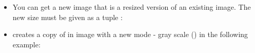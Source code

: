\documentclass[letterpaper,10pt,english]{sphinxmanual}
\begin{document}
\begin{itemize}
\item {} 
You can get a new image that is a resized version of an existing
image. The new size must be given as a tuple
:

\begin{sphinxVerbatim}[commandchars=\\\{\}]
   
\end{sphinxVerbatim}

\item {} 
 creates a copy of in image with a new mode -
gray scale () in the following example:

\begin{sphinxVerbatim}[commandchars=\\\{\}]
  
\end{sphinxVerbatim}

\end{itemize}
\end{document}
